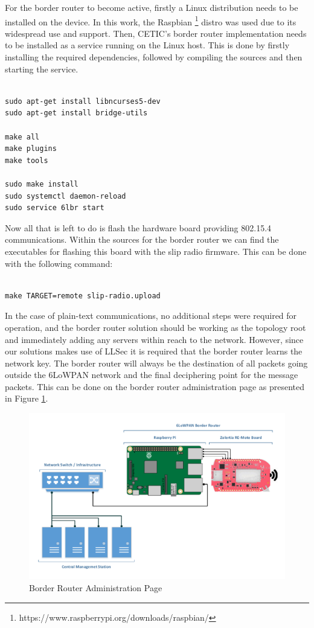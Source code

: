 For the border router to become active, firstly a Linux distribution needs to be installed on the device. In this work, the Raspbian \footnote{https://www.raspberrypi.org/downloads/raspbian/} distro was used due to its widespread use and support. Then, \gls{CETIC}'s border router implementation needs to be installed as a service running on the Linux host. This is done by firstly installing the required dependencies, followed by compiling the sources and then starting the service.

\begin{lstlisting}

sudo apt-get install libncurses5-dev
sudo apt-get install bridge-utils

make all
make plugins
make tools

sudo make install
sudo systemctl daemon-reload
sudo service 6lbr start

\end{lstlisting}

Now all that is left to do is flash the hardware board providing 802.15.4 communications. Within the sources for the border router we can find the executables for flashing this board with the slip radio firmware. This can be done with the following command:

\begin{lstlisting}

make TARGET=remote slip-radio.upload

\end{lstlisting}

In the case of plain-text communications, no additional steps were required for operation, and the border router solution should be working as the topology root and immediately adding any servers within reach to the network. However, since our solutions makes use of \gls{LLSec} it is required that the border router learns the network key. The border router will always be the destination of all packets going outside the \gls{6LoWPAN} network and the final deciphering point for the message packets. This can be done on the border router administration page as presented in Figure \ref{fig:administration_page}.

\begin{figure}[h]
  \centering
  \includegraphics[width=0.8\linewidth]{figures/Border_Router.pdf}
  \caption{Border Router Administration Page}
  \label{fig:administration_page}
\end{figure}



